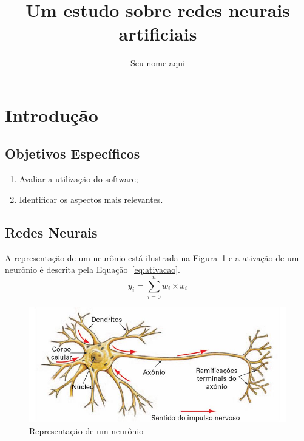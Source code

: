 \documentclass[a4paper, 12pt]{article}
\author{Seu nome aqui}
\title{Um estudo sobre redes neurais artificiais}
\begin{document}
	\maketitle
\section{Introdução}
\subsection{Objetivos Específicos}
\begin{enumerate}
	\item Avaliar a utilização do software;
	\item Identificar os aspectos mais relevantes.
\end{enumerate}
\subsection{Redes Neurais}
A representação de um neurônio está ilustrada na Figura~\ref{fig:neuronio} e a ativação de um neurônio é descrita pela Equação~\ref{eq:ativacao}.
\begin{equation}
y_i = \sum_{i=0}^{n} w_i \times x_i
\end{equation}\label{eq:ativacao}

\begin{figure}[htb]
	\centering
	\includegraphics[scale=.5]{neuronio}
	\caption{Representação de um neurônio}\label{fig:neuronio}
\end{figure}
\end{document}
